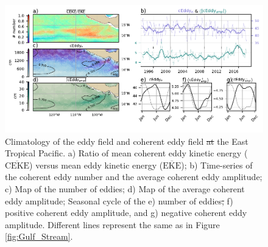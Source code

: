 \documentclass[draft,linenumbers]{agujournal2019}
\newcommand{\MEKE}{\overline{\textrm{EKE}}}
\newcommand{\MCEKE}{\overline{\textrm{CEKE}}}
\providecommand{\DIFadd}[1]{{\protect\color{blue}\uwave{#1}}} %
\providecommand{\DIFdel}[1]{{\protect\color{red}\sout{#1}}}                      %
\providecommand{\DIFaddFL}[1]{\DIFadd{#1}} %
\providecommand{\DIFdelFL}[1]{\DIFdel{#1}} %
\providecommand{\DIFaddbeginFL}{} %
\providecommand{\DIFaddendFL}{} %
\providecommand{\DIFdelbeginFL}{} %
\providecommand{\DIFdelendFL}{} %
\begin{document}
	\begin{figure}
	    \centering
	    \includegraphics[width=1\textwidth]{figures/regional_ratios_and_stats_V3_3.pdf}
	    \caption{Climatology of the eddy field and coherent eddy field \DIFdelbeginFL \DIFdelFL{at }\DIFdelendFL \DIFaddbeginFL \DIFaddFL{in }\DIFaddendFL the East Tropical Pacific. a) Ratio of mean coherent eddy kinetic energy ($\MCEKE$) versus mean eddy kinetic energy ($\MEKE$); b) Time-series of the coherent eddy number and the average coherent eddy amplitude; c) Map of the number of eddies; d) Map of the average coherent eddy amplitude; Seasonal cycle of the e) number of eddies\DIFdelbeginFL \DIFdelFL{, }\DIFdelendFL \DIFaddbeginFL \DIFaddFL{; }\DIFaddendFL f) positive coherent eddy amplitude, and g) negative coherent eddy amplitude. Different lines represent the same as in Figure \ref{fig:Gulf_Stream}.}
	    \label{fig:tehuantepec}
	\end{figure}	








\end{document}
